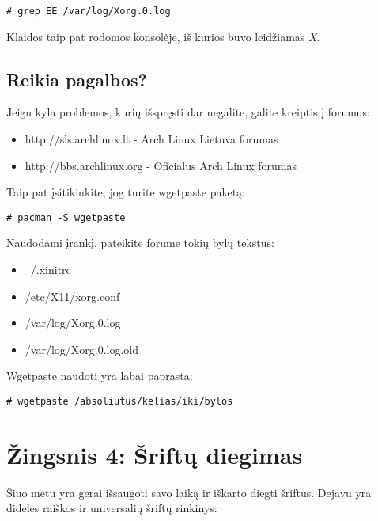       \begin{verbatim}
# grep EE /var/log/Xorg.0.log
      \end{verbatim}

      Klaidos taip pat rodomos konsolėje, iš kurios buvo leidžiamas \textsl{X}.

    \subsection{Reikia pagalbos?}

      Jeigu kyla problemos, kurių išspręsti dar negalite, galite
      kreiptis į forumus:

      \begin{itemize}
        \item http://sls.archlinux.lt - Arch Linux Lietuva forumas
        \item http://bbs.archlinux.org - Oficialus Arch Linux forumas
      \end{itemize}

      Taip pat įsitikinkite, jog turite wgetpaste paketą:

      \begin{verbatim}
# pacman -S wgetpaste
      \end{verbatim}

      Naudodami įrankį, pateikite forume tokių bylų tekstus:

      \begin{itemize}
        \item ~/.xinitrc
        \item /etc/X11/xorg.conf
        \item /var/log/Xorg.0.log
        \item /var/log/Xorg.0.log.old
      \end{itemize}

      Wgetpaste naudoti yra labai paprasta:

      \begin{verbatim}
# wgetpaste /absoliutus/kelias/iki/bylos        
      \end{verbatim}

  \section{Žingsnis 4: Šriftų diegimas}

    Šiuo metu yra gerai išsaugoti savo laiką ir iškarto diegti
    šriftus. Dejavu yra didelės raiškos ir universalių šriftų
    rinkinys:


